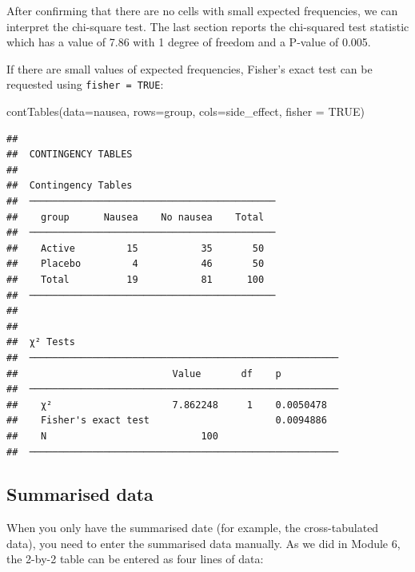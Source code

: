 \documentclass[
]{memoir}
\newenvironment{Shaded}{\begin{snugshade}}{\end{snugshade}}
\newcommand{\AttributeTok}[1]{\textcolor[rgb]{0.77,0.63,0.00}{#1}}
\newcommand{\ConstantTok}[1]{\textcolor[rgb]{0.00,0.00,0.00}{#1}}
\newcommand{\FunctionTok}[1]{\textcolor[rgb]{0.00,0.00,0.00}{#1}}
\newcommand{\NormalTok}[1]{#1}
\begin{document}
After confirming that there are no cells with small expected frequencies, we can interpret the chi-square test. The last section reports the chi-squared test statistic which has a value of 7.86 with 1 degree of freedom and a P-value of 0.005.

If there are small values of expected frequencies, Fisher's exact test can be requested using \texttt{fisher\ =\ TRUE}:

\begin{Shaded}
\begin{Highlighting}[]
\FunctionTok{contTables}\NormalTok{(}\AttributeTok{data=}\NormalTok{nausea,}
           \AttributeTok{rows=}\NormalTok{group, }\AttributeTok{cols=}\NormalTok{side\_effect,}
           \AttributeTok{fisher =} \ConstantTok{TRUE}\NormalTok{)}
\end{Highlighting}
\end{Shaded}

\begin{verbatim}
## 
##  CONTINGENCY TABLES
## 
##  Contingency Tables                          
##  ─────────────────────────────────────────── 
##    group      Nausea    No nausea    Total   
##  ─────────────────────────────────────────── 
##    Active         15           35       50   
##    Placebo         4           46       50   
##    Total          19           81      100   
##  ─────────────────────────────────────────── 
## 
## 
##  χ² Tests                                               
##  ────────────────────────────────────────────────────── 
##                           Value       df    p           
##  ────────────────────────────────────────────────────── 
##    χ²                     7.862248     1    0.0050478   
##    Fisher's exact test                      0.0094886   
##    N                           100                      
##  ──────────────────────────────────────────────────────
\end{verbatim}

\hypertarget{summarised-data-1}{%
\subsection{Summarised data}\label{summarised-data-1}}

When you only have the summarised date (for example, the cross-tabulated data), you need to enter the summarised data manually. As we did in Module 6, the 2-by-2 table can be entered as four lines of data:
\end{document}

